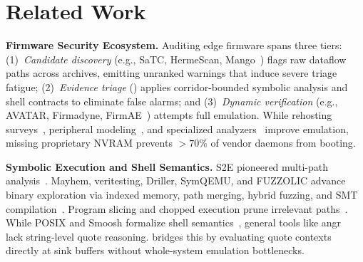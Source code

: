 \section{Related Work}
\label{sec:related}

\textbf{Firmware Security Ecosystem.}
Auditing edge firmware spans three tiers: (1)~\emph{Candidate discovery} (e.g., SaTC, HermeScan, Mango~\cite{firmalice2015,karonte2020,satc2021,hermescan2024,mango2024,ye2024cmd,costin2014firmware}) flags raw dataflow paths across archives, emitting unranked warnings that induce severe triage fatigue; (2)~\emph{Evidence triage} (\tool) applies corridor-bounded symbolic analysis and shell contracts to eliminate false alarms; and (3)~\emph{Dynamic verification} (e.g., AVATAR, Firmadyne, FirmAE~\cite{avatar2014,firmadyne2016,firmae2020}) attempts full emulation. While rehosting surveys~\cite{wright2021rehosting}, peripheral modeling~\cite{lee2023peripheral}, and specialized analyzers~\cite{firmwire2022,firmusb2017} improve emulation, missing proprietary NVRAM prevents $>70\%$ of vendor daemons from booting.

\textbf{Symbolic Execution and Shell Semantics.}
S2E pioneered multi-path analysis~\cite{s2e2011}. Mayhem, veritesting, Driller, SymQEMU, and FUZZOLIC advance binary exploration via indexed memory, path merging, hybrid fuzzing, and SMT compilation~\cite{mayhem2012,veritesting2014,driller2016,symqemu2021,fuzzolic2021,sage2012,surveyse2018}. Program slicing and chopped execution prune irrelevant paths~\cite{chopped2018,weiser1984,cegar2000}. While POSIX and Smoosh formalize shell semantics~\cite{posix2024,smoosh2020}, general tools like angr~\cite{angr2016,z3solver2008} lack string-level quote reasoning. \tool bridges this by evaluating quote contexts directly at sink buffers without whole-system emulation bottlenecks.
